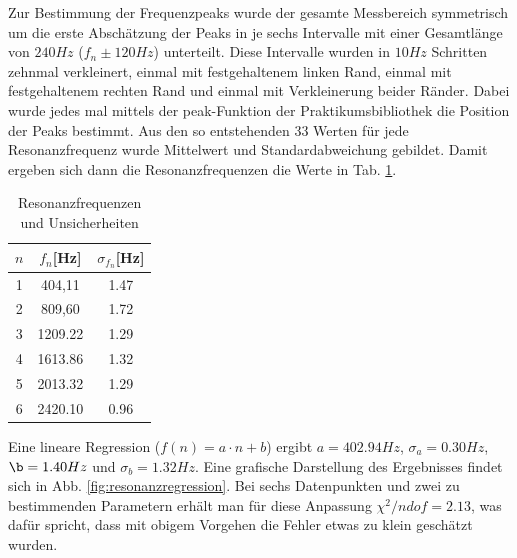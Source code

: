 \documentclass[12pt,a4paper]{article}
\begin{document}
Zur Bestimmung der Frequenzpeaks wurde der gesamte Messbereich symmetrisch um die erste Abschätzung der Peaks in je sechs Intervalle mit einer Gesamtlänge von $240Hz$ ($f_n \pm 120Hz$) unterteilt. Diese Intervalle wurden in $10Hz$ Schritten zehnmal verkleinert, einmal mit festgehaltenem linken Rand, einmal mit festgehaltenem rechten Rand und einmal mit Verkleinerung beider Ränder. Dabei wurde jedes mal mittels der peak-Funktion der Praktikumsbibliothek die Position der Peaks bestimmt. Aus den so entstehenden 33 Werten für jede Resonanzfrequenz wurde Mittelwert und Standardabweichung gebildet. Damit ergeben sich dann die Resonanzfrequenzen die Werte in Tab. \ref{resonanztabelle}.\\

\begin{table}
	\begin{center}
		
		\begin{tabular}{|c|c|c|}
			
			\hline 
			$n$ & $f_n$[Hz] & $\sigma_{f_n}$[Hz] \\ 
			\hline 
			1 & 404,11 & 1.47 \\ 
			\hline 
			2 & 809,60 &  1.72 \\ 
			\hline 
			3 & 1209.22 & 1.29 \\ 
			\hline 
			4 & 1613.86 & 1.32 \\ 
			\hline 
			5 &   2013.32 & 1.29 \\ 
			\hline 
			6 & 2420.10 &     0.96 \\ 
			\hline
		\end{tabular}
		\caption{Resonanzfrequenzen und Unsicherheiten}
		\label{resonanztabelle}
	\end{center}
\end{table} 

Eine lineare Regression ($f(n)=a \cdot n+b$) ergibt $a=402.94 Hz$, $\sigma_a=0.30 Hz$, $\b=1.40 Hz$ und $\sigma_b=1.32 Hz$. Eine grafische Darstellung des Ergebnisses findet sich in Abb. \ref{fig:resonanzregression}.  Bei sechs Datenpunkten und zwei zu bestimmenden Parametern erhält man für diese Anpassung $\chi^2/ndof=2.13$, was dafür spricht, dass mit obigem Vorgehen die Fehler etwas zu klein geschätzt wurden.\\
\end{document}
